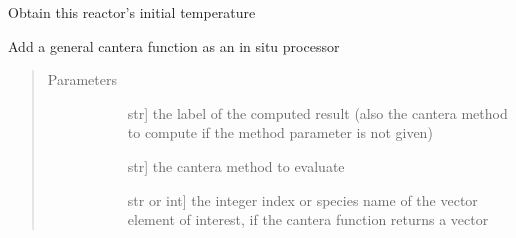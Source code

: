 \documentclass[letterpaper,10pt,english]{sphinxmanual}
\begin{document}
\begin{fulllineitems}

\begin{fulllineitems}
\label{\detokenize{spitfire.chemistry.reactors:spitfire.chemistry.reactors.HomogeneousReactor.initial_temperature}}
Obtain this reactor’s initial temperature

\end{fulllineitems}


\begin{fulllineitems}
\label{\detokenize{spitfire.chemistry.reactors:spitfire.chemistry.reactors.HomogeneousReactor.insitu_process_cantera_method}}
Add a general cantera function as an in situ processor
\begin{quote}\begin{description}
\item[{Parameters}] \leavevmode\begin{description}
\item[{}] \leavevmode{[}str{]}
the label of the computed result (also the cantera method to compute if the method parameter is not given)

\item[{}] \leavevmode{[}str{]}
the cantera method to evaluate

\item[{}] \leavevmode{[}str or int{]}
the integer index or species name of the vector element of interest, if the cantera function returns a vector

\end{description}

\end{description}\end{quote}

\end{fulllineitems}



\end{fulllineitems}
\end{document}
